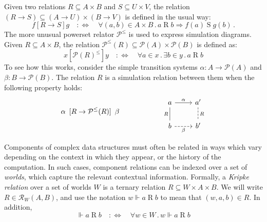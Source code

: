 \documentclass[acmsmall,screen,review,anonymous]{acmart}
\newcommand{\ifr}[1]{\mathrel{[{#1}]}}
\begin{document}
Given two relations
$R \subseteq A \times B$ and
$S \subseteq U \times V$,
the relation
$(R \rightarrow S) \subseteq
 (A \rightarrow U) \times
 (B \rightarrow V)$
is defined in the usual way:
\[
  f \ifr{R \rightarrow S} g
  \quad:\Leftrightarrow\quad
  \forall (a, b) \in A \times B \mathbin.
    a \mathrel{R} b \Rightarrow
    f(a) \mathrel{S} g(b)
  \,.
\]
The more unusual powerset relator $\mathcal{P}^\le$
is used to express simulation diagrams.
Given $R \subseteq A \times B$,
the relation
$\mathcal{P}^\le(R) \subseteq \mathcal{P}(A) \times \mathcal{P}(B)$
is defined as:
\[
  x \ifr{\mathcal{P}(R)^\le} y
  \quad:\Leftrightarrow\quad
  \forall a \in x \mathbin.
  \exists b \in y \mathbin.
  a \mathrel{R} b
\]
To see how this works,
consider the simple transition systems
$\alpha : A \rightarrow \mathcal{P}(A)$
and
$\beta : B \rightarrow \mathcal{P}(B)$.
The relation $R$ is a simulation relation between them
when the following property holds:
\[
  \alpha \:\ifr{R \rightarrow \mathcal{P}^\le(R)}\: \beta
  \qquad\qquad\qquad
  \begin{tikzcd}
    a \ar[r, "\alpha"] \ar[d, dash, "R"'] &
    a' \ar[d, dash, dashed, "R"] \\
    b \ar[r, dashed, "\beta"'] &
    b'
  \end{tikzcd}
\]

Components of complex data structures
must often be related in ways which vary
depending on the context in which they appear,
or the history of the computation.
In such cases,
component relations can be indexed over a set of \emph{worlds},
which capture the relevant contextual information.
Formally, a \emph{Kripke relation} over a set of worlds $W$
is a ternary relation $R \subseteq W \times A \times B$.
We will write $R \in \mathcal{R}_W(A, B)$,
and use the notation
$
  w \Vdash a \mathrel{R} b
$
to mean that $(w, a, b) \in R$.
In addition,
\[
  {} \Vdash a \mathrel{R} b
  \quad :\Leftrightarrow \quad
  \forall w\in W \mathbin. w \Vdash a \mathrel{R} b
\]
\end{document}
